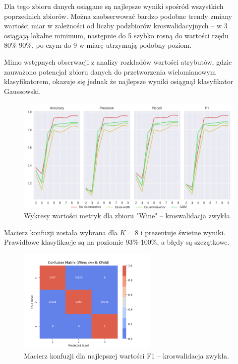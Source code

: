 Dla tego zbioru danych osiągane są najlepsze wyniki spośród wszystkich poprzednich zbiorów.
Można zaobserwować bardzo podobne trendy zmiany wartości miar w zależności od liczby podzbiorów
kroswalidacyjnych -- w 3 osiągają lokalne minimum, następnie do 5 szybko rosną do wartości rzędu 80\%-90\%,
po czym do 9 w miarę utrzymują podobny poziom.

Mimo wstępnych obserwacji z analizy rozkładów wartości atrybutów, gdzie zauważono
potencjał zbioru danych do przetworzenia wielomianowym klasyfikatorem, okazuje się jednak
że najlepsze wyniki osiągnął klasyfikator Gaussowski.

\begin{figure}[H]
\center
    \includegraphics[width=\textwidth]{img/cv_scores_kfold/scoring_kfold_wine.png}
    \caption{Wykresy wartości metryk dla zbioru "Wine" -- kroswalidacja zwykła.}
\end{figure}

Macierz konfuzji została wybrana dla $K = 8$ i prezentuje świetne wyniki. Prawidłowe
klasyfikacje są na poziomie 93\%-100\%, a błędy są szczątkowe.

\begin{figure}[H]
\center
    \includegraphics[width=0.6\textwidth]{img/conf_matrices/cm_Wine_cv8_KFold.png}
    \caption{Macierz konfuzji dla najlepszej wartości F1 -- kroswalidacja zwykła.}
\end{figure}

